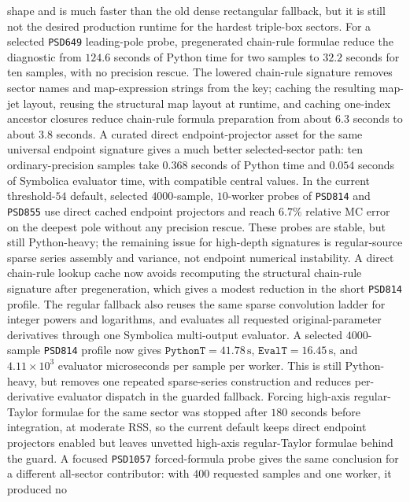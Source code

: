 \documentclass[11pt]{article}
\begin{document}
shape and is much faster than the old dense rectangular fallback, but it is
still not the desired production runtime for the hardest triple-box sectors.
For a selected \texttt{PSD649} leading-pole probe, pregenerated chain-rule
formulae reduce the diagnostic from \(124.6\) seconds of Python time for two
samples to \(32.2\) seconds for ten samples, with no precision rescue.  The
lowered chain-rule signature removes sector names and map-expression strings
from the key; caching the resulting map-jet layout, reusing the structural map
layout at runtime, and caching one-index ancestor closures reduce chain-rule
formula preparation from about \(6.3\) seconds to about \(3.8\) seconds.  A
curated direct endpoint-projector asset for the same universal endpoint
signature gives a much better selected-sector path: ten ordinary-precision
samples take \(0.368\) seconds of Python time and \(0.054\) seconds of
Symbolica evaluator time, with compatible central values.  In the current
threshold-\(54\) default, selected \(4000\)-sample, \(10\)-worker probes of
\texttt{PSD814} and \texttt{PSD855} use direct cached endpoint projectors and
reach \(6.7\%\) relative MC error on the deepest pole without any precision
rescue.  These probes are stable, but still Python-heavy; the remaining issue
for high-depth signatures is regular-source sparse series assembly and
variance, not endpoint numerical instability.  A direct chain-rule lookup cache
now avoids recomputing the structural chain-rule signature after pregeneration,
which gives a modest reduction in the short \texttt{PSD814} profile.  The
regular fallback also reuses the same sparse convolution ladder for integer
powers and logarithms, and evaluates all requested original-parameter
derivatives through one Symbolica multi-output evaluator.  A selected
\(4000\)-sample \texttt{PSD814} profile now gives
\(\texttt{PythonT}=41.78\,\mathrm{s}\), \(\texttt{EvalT}=16.45\,\mathrm{s}\),
and \(4.11\times 10^3\) evaluator microseconds per sample per worker.  This is
still Python-heavy, but removes one repeated sparse-series construction and
reduces per-derivative evaluator dispatch in the guarded fallback.  Forcing
high-axis regular-Taylor formulae for the same sector was stopped after
\(180\) seconds before integration, at moderate RSS, so the current default
keeps direct endpoint projectors enabled but leaves unvetted high-axis
regular-Taylor formulae behind the guard.  A focused \texttt{PSD1057}
forced-formula probe gives the same conclusion for a different all-sector
contributor: with \(400\) requested samples and one worker, it produced no
\end{document}
